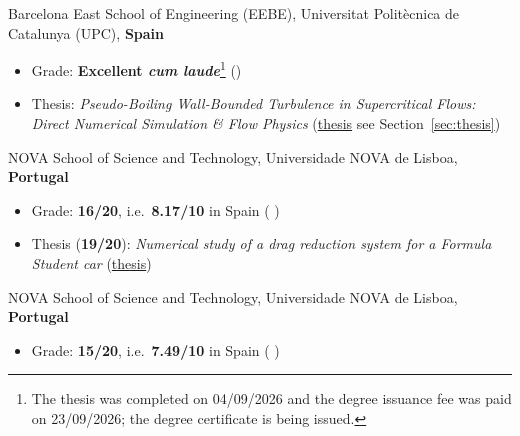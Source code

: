 \documentclass[11pt]{article}
\begin{document}
\begin{entries}
    {Barcelona East School of Engineering (EEBE), Universitat Polit\`ecnica de Catalunya
    (UPC), \textbf{Spain}}
  \begin{itemize}
    \item Grade: \textbf{Excellent \emph{cum laude}}\footnote{The thesis was
    completed on 04/09/2026 and the degree issuance fee was paid on 23/09/2026; the degree
    certificate is being issued.} ()
    \item Thesis: \emph{Pseudo-Boiling Wall-Bounded Turbulence in Supercritical
    Flows: Direct Numerical Simulation \& Flow Physics} (\href{https://hdl.handle.net/2117/473525}{thesis} \docsep see
    Section~\ref{sec:thesis})
  \end{itemize}

    {NOVA School of Science and Technology, Universidade NOVA de Lisboa, \textbf{Portugal}}
  \begin{itemize}
    \item Grade: \textbf{16/20}, i.e.\ \textbf{8.17/10} in Spain (
    \docsep {} \docsep {}
    \docsep {})
    \item Thesis (\textbf{19/20}): \emph{Numerical study of a drag reduction system for a
    Formula Student car} (\href{http://hdl.handle.net/10362/149236}{thesis})
  \end{itemize}


    {NOVA School of Science and Technology, Universidade NOVA de Lisboa, \textbf{Portugal}}
  \begin{itemize}
    \item Grade: \textbf{15/20}, i.e.\ \textbf{7.49/10} in Spain (
    \docsep {} \docsep {})
  \end{itemize}
\end{entries}
\end{document}
